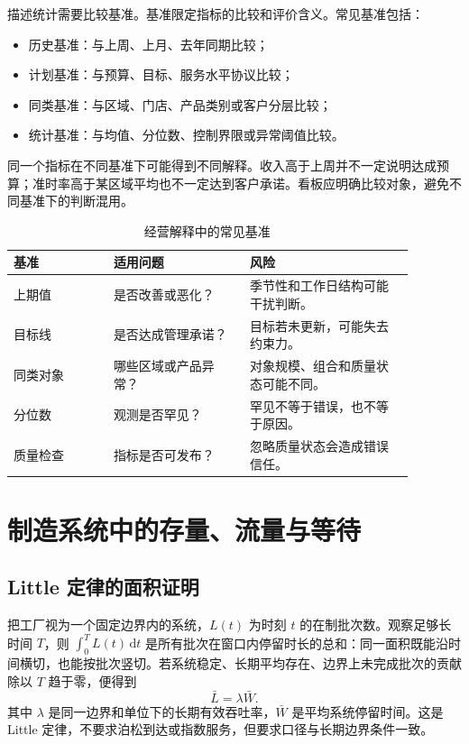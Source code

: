 描述统计需要比较基准。基准限定指标的比较和评价含义。常见基准包括：
\begin{itemize}
  \item 历史基准：与上周、上月、去年同期比较；
  \item 计划基准：与预算、目标、服务水平协议比较；
  \item 同类基准：与区域、门店、产品类别或客户分层比较；
  \item 统计基准：与均值、分位数、控制界限或异常阈值比较。
\end{itemize}

同一个指标在不同基准下可能得到不同解释。收入高于上周并不一定说明达成预算；准时率高于某区域平均也不一定达到客户承诺。看板应明确比较对象，避免不同基准下的判断混用。

\begin{table}[htbp]
\centering
\caption{经营解释中的常见基准}
\begin{tabular}{P{0.22\linewidth}P{0.30\linewidth}P{0.36\linewidth}}
\toprule
{}
基准 & 适用问题 & 风险\\
\midrule

上期值 & 是否改善或恶化？ & 季节性和工作日结构可能干扰判断。\\
目标线 & 是否达成管理承诺？ & 目标若未更新，可能失去约束力。\\
同类对象 & 哪些区域或产品异常？ & 对象规模、组合和质量状态可能不同。\\
分位数 & 观测是否罕见？ & 罕见不等于错误，也不等于原因。\\
质量检查 & 指标是否可发布？ & 忽略质量状态会造成错误信任。\\
\bottomrule
\end{tabular}
\end{table}

\section{制造系统中的存量、流量与等待}

\subsection{Little 定律的面积证明}
把工厂视为一个固定边界内的系统，\(L(t)\) 为时刻 \(t\) 的在制批次数。观察足够长时间 \(T\)，则 \(\int_0^T L(t)\,\mathrm dt\) 是所有批次在窗口内停留时长的总和：同一面积既能沿时间横切，也能按批次竖切。若系统稳定、长期平均存在、边界上未完成批次的贡献除以 \(T\) 趋于零，便得到
\[
\bar L=\lambda\bar W.
\]
其中 \(\lambda\) 是同一边界和单位下的长期有效吞吐率，\(\bar W\) 是平均系统停留时间。这是 Little 定律\cite{little05}，不要求泊松到达或指数服务，但要求口径与长期边界条件一致。

